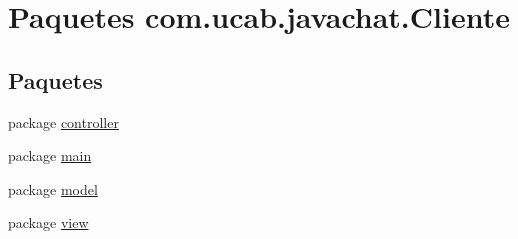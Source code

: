 \hypertarget{namespacecom_1_1ucab_1_1javachat_1_1_cliente}{\section{Paquetes com.\-ucab.\-javachat.\-Cliente}
\label{namespacecom_1_1ucab_1_1javachat_1_1_cliente}
}
\subsection*{Paquetes}
\begin{DoxyCompactItemize}
\item 
package \hyperlink{namespacecom_1_1ucab_1_1javachat_1_1_cliente_1_1controller}{controller}
\item 
package \hyperlink{namespacecom_1_1ucab_1_1javachat_1_1_cliente_1_1main}{main}
\item 
package \hyperlink{namespacecom_1_1ucab_1_1javachat_1_1_cliente_1_1model}{model}
\item 
package \hyperlink{namespacecom_1_1ucab_1_1javachat_1_1_cliente_1_1view}{view}
\end{DoxyCompactItemize}
